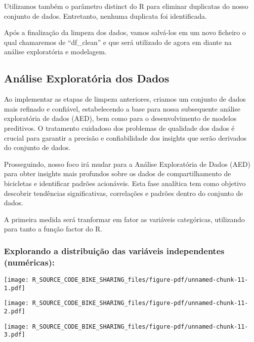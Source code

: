 \documentclass[
  letterpaper,
  DIV=11,
  numbers=noendperiod]{scrartcl}
\begin{document}
Utilizamos também o parâmetro distinct do R para eliminar duplicatas do
nosso conjunto de dados. Entretanto, nenhuma duplicata foi identificada.

Após a finalização da limpeza dos dados, vamos salvá-los em um novo
ficheiro o qual chamaremos de ``df\_clean'' e que será utilizado de
agora em diante na análise exploratória e modelagem.

\subsection{Análise Exploratória dos
Dados}\label{anuxe1lise-exploratuxf3ria-dos-dados}

Ao implementar as etapas de limpeza anteriores, criamos um conjunto de
dados mais refinado e confiável, estabelecendo a base para nossa
subsequente análise exploratória de dados (AED), bem como para o
desenvolvimento de modelos preditivos. O tratamento cuidadoso dos
problemas de qualidade dos dados é crucial para garantir a precisão e
confiabilidade dos insights que serão derivados do conjunto de dados.

Prosseguindo, nosso foco irá mudar para a Análise Exploratória de Dados
(AED) para obter insights mais profundos sobre os dados de
compartilhamento de bicicletas e identificar padrões acionáveis. Esta
fase analítica tem como objetivo descobrir tendências significativas,
correlações e padrões dentro do conjunto de dados.

A primeira medida será tranformar em fator as variáveis categóricas,
utilizando para tanto a função factor do R.

\subsubsection{Explorando a distribuição das variáveis independentes
(numéricas):}\label{explorando-a-distribuiuxe7uxe3o-das-variuxe1veis-independentes-numuxe9ricas}

\begin{center}
\texttt{[image: R\_SOURCE\_CODE\_BIKE\_SHARING\_files/figure-pdf/unnamed-chunk-11-1.pdf]}
\end{center}

\begin{center}
\texttt{[image: R\_SOURCE\_CODE\_BIKE\_SHARING\_files/figure-pdf/unnamed-chunk-11-2.pdf]}
\end{center}

\begin{center}
\texttt{[image: R\_SOURCE\_CODE\_BIKE\_SHARING\_files/figure-pdf/unnamed-chunk-11-3.pdf]}
\end{center}
\end{document}

